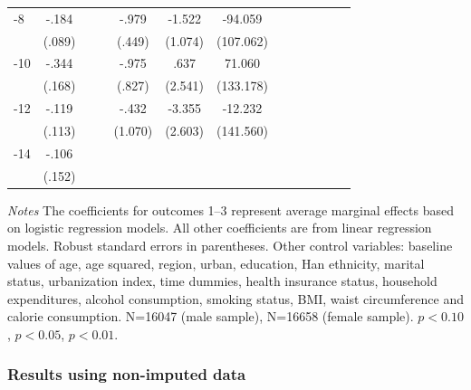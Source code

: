 \begin{table}[p]
\begin{adjustbox}{max width=\linewidth}
\begin{threeparttable}
{\begin{tabular}{l*{6}{S
S}}
-8             &    -.184\sym{**} &         &         &    -.979\sym{**} &   -1.522         &  -94.059         \\
                &   (.089)         &         &         &   (.449)         &  (1.074)         &(107.062)         \\
-10            &    -.344\sym{**} &         &         &    -.975         &     .637         &   71.060         \\
                &   (.168)         &         &         &   (.827)         &  (2.541)         &(133.178)         \\
-12           &    -.119         &         &         &    -.432         &   -3.355         &  -12.232         \\
                &   (.113)         &         &         &  (1.070)         &  (2.603)         &(141.560)         \\
-14           &    -.106         &         &         &                  &                  &                  \\
                &   (.152)         &         &         &                  &                  &                  \\
\bottomrule
\end{tabular}
\begin{tablenotes}
\item \footnotesize \textit{Notes} The coefficients for outcomes 1--3 represent average marginal effects based on logistic regression models. All other coefficients are from linear regression models.  Robust standard errors in parentheses.
Other control variables: baseline values of age, age squared, region, urban, education, Han ethnicity, marital status, urbanization index, time dummies, health insurance status, household expenditures, alcohol consumption, smoking status, BMI, waist circumference and calorie consumption. N=16047 (male sample), N=16658 (female sample). \sym{*} \(p<0.10\), \sym{**} \(p<0.05\), \sym{***} \(p<0.01\).
\end{tablenotes}
}
\end{threeparttable}
\end{adjustbox}
\end{table}

\clearpage
\subsubsection*{Results using non-imputed data}

